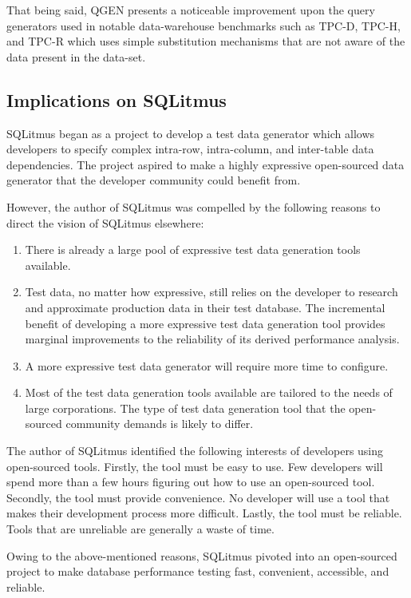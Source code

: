\documentclass[12pt]{article}
\begin{document}
\begin{spacing}{1.9}
		
		That being said, QGEN presents a noticeable improvement upon the query generators used in notable data-warehouse benchmarks such as TPC-D, TPC-H, and TPC-R which uses simple substitution mechanisms that are not aware of the data present in the data-set.
		
		\subsection{Implications on SQLitmus}
		SQLitmus began as a project to develop a test data generator which allows developers to specify complex intra-row, intra-column, and inter-table data dependencies. The project aspired to make a highly expressive open-sourced data generator that the developer community could benefit from.
		
		However, the author of SQLitmus was compelled by the following reasons to direct the vision of SQLitmus elsewhere:
		\begin{enumerate}
			\item There is already a large pool of expressive test data generation tools available.
			\item Test data, no matter how expressive, still relies on the developer to research and approximate production data in their test database. The incremental benefit of developing a more expressive test data generation tool provides marginal improvements to the reliability of its derived performance analysis.
			\item A more expressive test data generator will require more time to configure. 
			\item Most of the test data generation tools available are tailored to the needs of large corporations. The type of test data generation tool that the open-sourced community demands is likely to differ. 
		\end{enumerate}
		
		The author of SQLitmus identified the following interests of developers using open-sourced tools. Firstly, the tool must be easy to use. Few developers will spend more than a few hours figuring out how to use an open-sourced tool. Secondly, the tool must provide convenience. No developer will use a tool that makes their development process more difficult. Lastly, the tool must be reliable. Tools that are unreliable are generally a waste of time.
		
		Owing to the above-mentioned reasons, SQLitmus pivoted into an open-sourced project to make database performance testing fast, convenient, accessible, and reliable.
		

\end{spacing}
\end{document}

